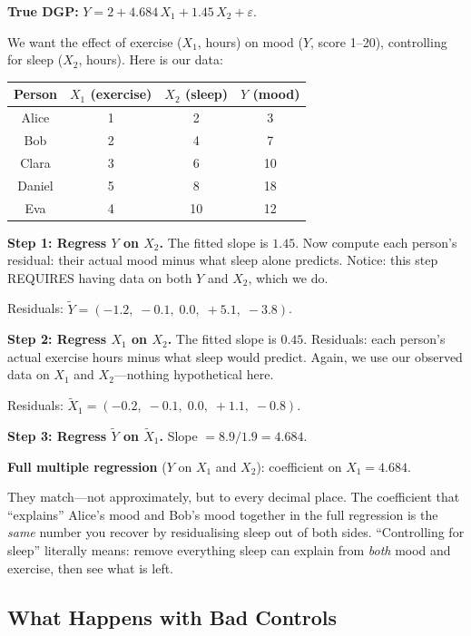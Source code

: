 \documentclass[11pt,a4paper]{article}
\theoremstyle{definition}
\theoremstyle{plain}
\theoremstyle{remark}
\begin{document}
\begin{numermark}[title={Exercise, Sleep, and Mood}]
\textbf{True DGP:} $Y = 2 + 4.684\, X_1 + 1.45\, X_2 + \varepsilon$.

We want the effect of exercise ($X_1$, hours) on mood ($Y$, score 1--20), controlling for sleep ($X_2$, hours). Here is our data:

\begin{center}
\begin{tabular}{@{}cccc@{}}
\toprule
Person & $X_1$ (exercise) & $X_2$ (sleep) & $Y$ (mood) \\
\midrule
Alice & 1 & 2 & 3 \\
Bob & 2 & 4 & 7 \\
Clara & 3 & 6 & 10 \\
Daniel & 5 & 8 & 18 \\
Eva & 4 & 10 & 12 \\
\bottomrule
\end{tabular}
\end{center}

\textbf{Step 1: Regress $Y$ on $X_2$.} The fitted slope is $1.45$. Now compute each person's residual: their actual mood minus what sleep alone predicts. Notice: this step REQUIRES having data on both $Y$ and $X_2$, which we do.

Residuals: $\tilde{Y} = (-1.2,\; -0.1,\; 0.0,\; +5.1,\; -3.8)$.

\textbf{Step 2: Regress $X_1$ on $X_2$.} The fitted slope is $0.45$. Residuals: each person's actual exercise hours minus what sleep would predict. Again, we use our observed data on $X_1$ and $X_2$---nothing hypothetical here.

Residuals: $\tilde{X}_1 = (-0.2,\; -0.1,\; 0.0,\; +1.1,\; -0.8)$.

\textbf{Step 3: Regress $\tilde{Y}$ on $\tilde{X}_1$.} Slope $= 8.9 / 1.9 = \mathbf{4.684}$.

\textbf{Full multiple regression} ($Y$ on $X_1$ and $X_2$): coefficient on $X_1 = \mathbf{4.684}$.

They match---not approximately, but to every decimal place. The coefficient that ``explains'' Alice's mood and Bob's mood together in the full regression is the \emph{same} number you recover by residualising sleep out of both sides. ``Controlling for sleep'' literally means: remove everything sleep can explain from \emph{both} mood and exercise, then see what is left.
\end{numermark}

\subsection{What Happens with Bad Controls}
\end{document}
